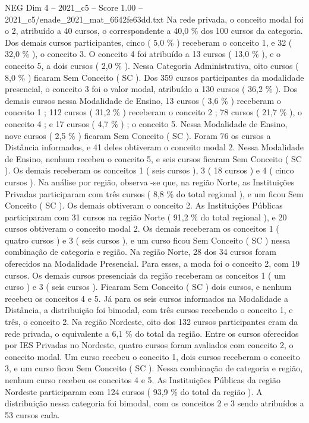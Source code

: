 \begin{textsample}{NEG Dim 4 – 2021\_c5 – Score 1.00 – 2021\_c5/enade\_2021\_mat\_6642fe63dd.txt}
Na rede privada, o conceito modal foi o 2, atribuído a 40 cursos, o correspondente a 40,0 \% dos 100 cursos da categoria.
Dos demais cursos participantes, cinco ( 5,0 \% ) receberam o conceito 1, e 32 ( 32,0 \% ), o conceito 3.
O conceito 4 foi atribuído a 13 cursos ( 13,0 \% ), e o conceito 5, a dois cursos ( 2,0 \% ).
Nessa Categoria Administrativa, oito cursos ( 8,0 \% ) ficaram Sem Conceito ( SC ).
Dos 359 cursos participantes da modalidade presencial, o conceito 3 foi o valor modal, atribuído a 130 cursos ( 36,2 \% ).
Dos demais cursos nessa Modalidade de Ensino, 13 cursos ( 3,6 \% ) receberam o conceito 1 ; 112 cursos ( 31,2 \% ) receberam o conceito 2 ; 78 cursos ( 21,7 \% ), o conceito 4 ; e 17 cursos ( 4,7 \% ) ; o conceito 5.
Nessa Modalidade de Ensino, nove cursos ( 2,5 \% ) ficaram Sem Conceito ( SC ).
Foram 76 os cursos a Distância informados, e 41 deles obtiveram o conceito modal 2.
Nessa Modalidade de Ensino, nenhum recebeu o conceito 5, e seis cursos ficaram Sem Conceito ( SC ).
Os demais receberam os conceitos 1 ( seis cursos ), 3 ( 18 cursos ) e 4 ( cinco cursos ).
Na análise por região, observa -se que, na região Norte, as Instituições Privadas participaram com três cursos ( 8,8 \% do total regional ), e um ficou Sem Conceito ( SC ).
Os demais obtiveram o conceito 2.
As Instituições Públicas participaram com 31 cursos na região Norte ( 91,2 \% do total regional ), e 20 cursos obtiveram o conceito modal 2.
Os demais receberam os conceitos 1 ( quatro cursos ) e 3 ( seis cursos ), e um curso ficou Sem Conceito ( SC ) nessa combinação de categoria e região.
Na região Norte, 28 dos 34 cursos foram oferecidos na Modalidade Presencial.
Para esses, a moda foi o conceito 2, com 19 cursos.
Os demais cursos presenciais da região receberam os conceitos 1 ( um curso ) e 3 ( seis cursos ).
Ficaram Sem Conceito ( SC ) dois cursos, e nenhum recebeu os conceitos 4 e 5.
Já para os seis cursos informados na Modalidade a Distância, a distribuição foi bimodal, com três cursos recebendo o conceito 1, e três, o conceito 2.
Na região Nordeste, oito dos 132 cursos participantes eram da rede privada, o equivalente a 6,1 \% do total da região.
Entre os cursos oferecidos por IES Privadas no Nordeste, quatro cursos foram avaliados com conceito 2, o conceito modal.
Um curso recebeu o conceito 1, dois cursos receberam o conceito 3, e um curso ficou Sem Conceito ( SC ).
Nessa combinação de categoria e região, nenhum curso recebeu os conceitos 4 e 5.
As Instituições Públicas da região Nordeste participaram com 124 cursos ( 93,9 \% do total da região ).
A distribuição nessa categoria foi bimodal, com os conceitos 2 e 3 sendo atribuídos a 53 cursos cada.

\end{textsample}
